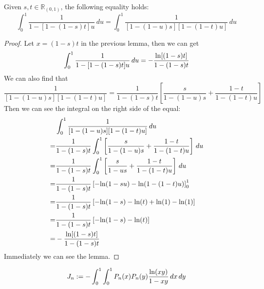 \begin{lemma}\label{two_var_substitution}
    Given $s, t \in \mathbb{R}_{(0,1)}$, the following equality holds:
    \[ \int_{0}^{1} \frac{1}{1 - [1 - (1 - s)t]u} \, du = \int_{0}^{1} \frac{1}{[1 - (1 - u)s][1 - (1 - t)u]} \, du \]
\end{lemma}
\begin{proof}
    \leanok
    Let $x = (1 - s)t$ in the previous lemma, then we can get 
    \[ \int_{0}^{1} \frac{1}{1 - [1 - (1 - s)t]u} \, du = -\frac{{\rm ln}[(1 - s)t]}{1 - (1 - s)t}\]
    We can also find that
    \[ \frac{1}{[1 - (1 - u)s][1 - (1 - t)u]} = \frac{1}{1 - (1 - s)t}\left[\frac{s}{1 - (1 - u)s} + \frac{1-t}{1 - (1 - t)u} \right] \]
    Then we can see the integral on the right side of the equal:
    \begin{align*}
        &\int_{0}^{1} \frac{1}{[1 - (1 - u)s][1 - (1 - t)u]} \, du \\
        =&\frac{1}{1 - (1 - s)t}\int_{0}^{1} \left[\frac{s}{1 - (1 - u)s} + \frac{1-t}{1 - (1 - t)u} \right] \, du \\
        =&\frac{1}{1 - (1 - s)t}\int_{0}^{1} \left[\frac{s}{1 - us} + \frac{1-t}{1 - (1 - t)u} \right] \, du \\
        =&\frac{1}{1 - (1 - s)t}\left[-{\rm ln}(1-su)-{\rm ln}(1-(1-t)u) \right]_{0}^{1}\\
        =&\frac{1}{1 - (1 - s)t}\left[-{\rm ln}(1-s)-{\rm ln}(t)+{\rm ln}(1)-{\rm ln}(1) \right]\\
        =&\frac{1}{1 - (1 - s)t}\left[-{\rm ln}(1-s)-{\rm ln}(t) \right]\\
        =&-\frac{{\rm ln}[(1 - s)t]}{1 - (1 - s)t}
    \end{align*}
    Immediately we can see the lemma.
\end{proof}

\begin{definition}\label{J_n}
    \leanok
    \[ J_n := - \int_{0}^{1}\int_{0}^{1} P_n(x)P_n(y)\frac{{\rm ln}(xy)}{1-xy} \, dx \, dy \]
\end{definition}

